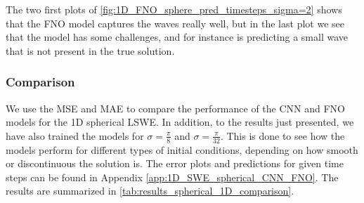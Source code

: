 The two first plots of \autoref{fig:1D_FNO_sphere_pred_timesteps_sigma=2} shows that the FNO model captures the waves really well, but in the last plot we see that the model has some challenges, and for instance is predicting a small wave that is not present in the true solution.

\subsubsection*{Comparison}
We use the MSE and MAE to compare the performance of the CNN and FNO models for the 1D spherical LSWE.
In addition, to the results just presented, we have also trained the models for $\sigma = \frac{\pi}{8}$ and $\sigma = \frac{\pi}{32}$.
This is done to see how the models perform for different types of initial conditions, depending on how smooth or discontinuous the solution is.
The error plots and predictions for given time steps can be found in Appendix \autoref{app:1D_SWE_spherical_CNN_FNO}.
The results are summarized in \autoref{tab:results_spherical_1D_comparison}.
